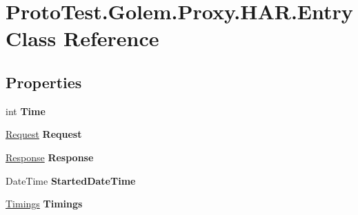 \hypertarget{class_proto_test_1_1_golem_1_1_proxy_1_1_h_a_r_1_1_entry}{\section{Proto\-Test.\-Golem.\-Proxy.\-H\-A\-R.\-Entry Class Reference}
\label{class_proto_test_1_1_golem_1_1_proxy_1_1_h_a_r_1_1_entry}
}
\subsection*{Properties}
\begin{DoxyCompactItemize}
\item 
\hypertarget{class_proto_test_1_1_golem_1_1_proxy_1_1_h_a_r_1_1_entry_a7547814fa02ad7c7786cf2efec70e746}{int {\bfseries Time}}\label{class_proto_test_1_1_golem_1_1_proxy_1_1_h_a_r_1_1_entry_a7547814fa02ad7c7786cf2efec70e746}

\item 
\hypertarget{class_proto_test_1_1_golem_1_1_proxy_1_1_h_a_r_1_1_entry_a9e8b5ab7368625f939e35e220d5df9b8}{\hyperlink{class_proto_test_1_1_golem_1_1_proxy_1_1_h_a_r_1_1_request}{Request} {\bfseries Request}}\label{class_proto_test_1_1_golem_1_1_proxy_1_1_h_a_r_1_1_entry_a9e8b5ab7368625f939e35e220d5df9b8}

\item 
\hypertarget{class_proto_test_1_1_golem_1_1_proxy_1_1_h_a_r_1_1_entry_a75966ea625dc8bcc36be637ae5c29d78}{\hyperlink{class_proto_test_1_1_golem_1_1_proxy_1_1_h_a_r_1_1_response}{Response} {\bfseries Response}}\label{class_proto_test_1_1_golem_1_1_proxy_1_1_h_a_r_1_1_entry_a75966ea625dc8bcc36be637ae5c29d78}

\item 
\hypertarget{class_proto_test_1_1_golem_1_1_proxy_1_1_h_a_r_1_1_entry_a7ce831982e358918e9a6695bbfa185b8}{Date\-Time {\bfseries Started\-Date\-Time}}\label{class_proto_test_1_1_golem_1_1_proxy_1_1_h_a_r_1_1_entry_a7ce831982e358918e9a6695bbfa185b8}

\item 
\hypertarget{class_proto_test_1_1_golem_1_1_proxy_1_1_h_a_r_1_1_entry_afff734c2ef562347e9da3f948b31e949}{\hyperlink{class_proto_test_1_1_golem_1_1_proxy_1_1_h_a_r_1_1_timings}{Timings} {\bfseries Timings}}\label{class_proto_test_1_1_golem_1_1_proxy_1_1_h_a_r_1_1_entry_afff734c2ef562347e9da3f948b31e949}


\end{DoxyCompactItemize}
